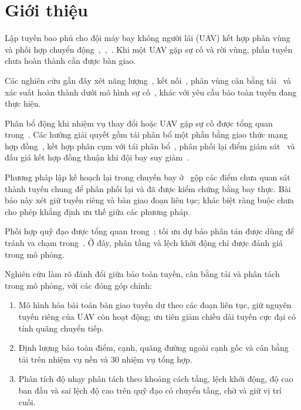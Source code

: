 \documentclass[11pt,a4paper]{article}
\newif\ifanonymous
\begin{document}
\ifanonymous\else
\begingroup
\renewcommand{\thefootnote}{*}
\renewcommand{\footnotesize}{\fontsize{9}{10.5}\selectfont}
\endgroup
\fi

\clearpage
\section{Giới thiệu}

Lập tuyến bao phủ cho đội máy bay không người lái (UAV) kết hợp phân vùng và phối hợp chuyển động~\cite{Fevgas2022},~\cite{Kumar2023},~\cite{PathSurvey2025}. Khi một UAV gặp sự cố và rời vùng, phần tuyến chưa hoàn thành cần được bàn giao.

Các nghiên cứu gần đây xét năng lượng~\cite{Datsko2024}, kết nối~\cite{Guven2024}, phân vùng cân bằng tải~\cite{Gao2024} và xác suất hoàn thành dưới mô hình sự cố~\cite{Li2024}, khác với yêu cầu bảo toàn tuyến đang thực hiện.

Phân bổ động khi nhiệm vụ thay đổi hoặc UAV gặp sự cố được tổng quan trong~\cite{AlqefariReview2025}. Các hướng giải quyết gồm tái phân bổ một phần bằng giao thức mạng hợp đồng~\cite{Wang2023}, kết hợp phân cụm với tái phân bổ~\cite{AlqefariHybrid2025}, phân phối lại điểm giám sát~\cite{Zhang2025} và đấu giá kết hợp đồng thuận khi đội bay suy giảm~\cite{Barnawi2025}.

Phương pháp lập kế hoạch lại trong chuyến bay ở~\cite{Luna2024} gộp các điểm chưa quan sát thành tuyến chung để phân phối lại và đã được kiểm chứng bằng bay thực. Bài báo này xét giữ tuyến riêng và bàn giao đoạn liên tục; khác biệt ràng buộc chưa cho phép khẳng định ưu thế giữa các phương pháp.

Phối hợp quỹ đạo được tổng quan trong~\cite{WangReview2024}; tối ưu dự báo phân tán được dùng để tránh va chạm trong~\cite{Jiang2023}. Ở đây, phân tầng và lệch khởi động chỉ được đánh giá trong mô phỏng.

Nghiên cứu làm rõ đánh đổi giữa bảo toàn tuyến, cân bằng tải và phân tách trong mô phỏng, với các đóng góp chính:
\begin{enumerate}[leftmargin=*,itemsep=2pt]
  \item Mô hình hóa bài toán bàn giao tuyến dư theo các đoạn liên tục, giữ nguyên tuyến riêng của UAV còn hoạt động; ưu tiên giảm chiều dài tuyến cực đại có tính quãng chuyển tiếp.
  \item Định lượng bảo toàn điểm, cạnh, quãng đường ngoài cạnh gốc và cân bằng tải trên nhiệm vụ nền và 30 nhiệm vụ tổng hợp.
  \item Phân tích độ nhạy phân tách theo khoảng cách tầng, lệch khởi động, độ cao ban đầu và sai lệch độ cao trên quỹ đạo có chuyển tầng, chờ và giữ vị trí cuối.
\end{enumerate}
\end{document}
